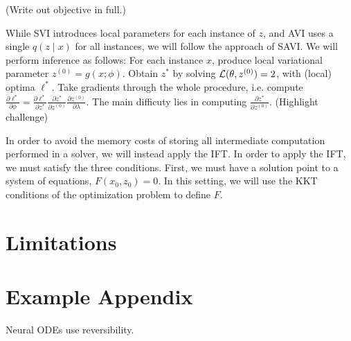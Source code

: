 \documentclass[11pt]{article}
\begin{document}
(Write out objective in full.)

While SVI introduces local parameters for each instance of $z$,
and AVI uses a single $q(z \mid x)$ for all instances,
we will follow the approach of SAVI.
We will perform inference as follows:
For each instance $x$, produce local variational parameter
$z^{(0)} = g(x; \phi)$.
Obtain $z^*$ by solving $\mathcal{L}(\theta, z^{(0)}) = 2$, with (local) optima $\ell^*$.
Take gradients through the whole procedure,
i.e. compute $\frac{\partial \ell^*}{\partial \phi}
= \frac{\partial\ell^*}{\partial z^*}\frac{\partial z^*}{\partial z^{(0)}}
\frac{\partial z^{(0)}}{\partial \lambda}$.
The main difficuty lies in computing $\frac{\partial z^*}{\partial z^{(0)}}$.
(Highlight challenge)

In order to avoid the memory costs of storing all intermediate computation performed
in a solver, we will instead apply the IFT.
In order to apply the IFT, we must satisfy the three conditions.
First, we must have a solution point to a system of equations, $F(x_0, z_0) = 0$.
In this setting, we will use the KKT conditions of the optimization problem to define $F$.

\section{Limitations}



\appendix

\section{Example Appendix}
\label{sec:appendix}

Neural ODEs use reversibility.
\end{document}
